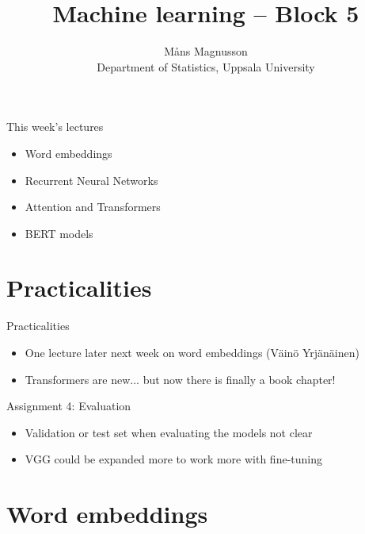 \documentclass[10pt]{beamer}
\title[]{{\color{black}Machine learning -- Block 5}}
\author[]{M{\aa}ns Magnusson\\Department of Statistics, Uppsala University}
\date{\currentsemester}
\begin{document}
\frame{\titlepage
}



\begin{frame}{This week's lectures}
\begin{itemize}
\item Word embeddings
\item Recurrent Neural Networks
\item Attention and Transformers
\item BERT models
\end{itemize}
\end{frame}




\section{Practicalities}

\begin{frame}{Practicalities}

\begin{itemize}
\item One lecture later next week on word embeddings (Väinö Yrjänäinen)
\item Transformers are new... but now there is finally a book chapter!
\end{itemize}

\end{frame}


\begin{frame}{Assignment 4: Evaluation}

\begin{itemize}
\item Validation or test set when evaluating the models not clear
\item VGG could be expanded more to work more with fine-tuning
\end{itemize}

\end{frame}


\section{Word embeddings}
\frame{\sectionpage}
\end{document}

